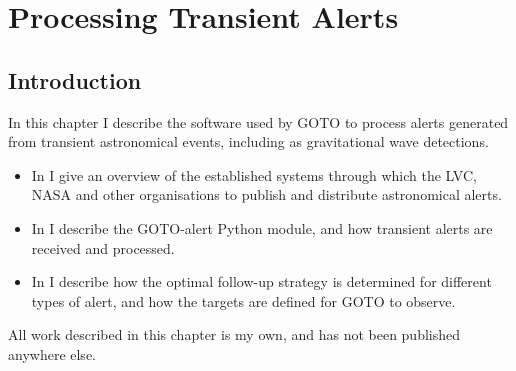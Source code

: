 \chapter{Processing Transient Alerts}
\label{chap:alerts}
\chaptoc{}


\newpage
\section{Introduction}
\label{sec:alerts_intro}
\begin{colsection}

In this chapter I describe the software used by GOTO to process alerts generated from transient astronomical events, including as gravitational wave detections.
%
\begin{itemize}
    \item In  I give an overview of the established systems through which the LVC, NASA and other organisations to publish and distribute astronomical alerts.
    \item In  I describe the GOTO-alert Python module, and how transient alerts are received and processed.
    \item In  I describe how the optimal follow-up strategy is determined for different types of alert, and how the targets are defined for GOTO to observe.
\end{itemize}
%
All work described in this chapter is my own, and has not been published anywhere else.

\end{colsection}


\newpage
